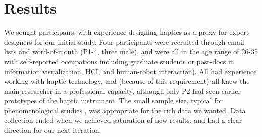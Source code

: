 %
% 
\section{Results}

We sought participants with experience designing haptics as a proxy for expert designers for our initial study.
Four participants were recruited through email lists and word-of-mouth (P1-4, three male), and were all in the age range of 26-35 with self-reported occupations including graduate students or post-docs in information visualization, HCI, and human-robot interaction).
All had experience working with haptic technology, and (because of this requirement) all knew the main researcher in a professional capacity, although only P2 had seen earlier prototypes of the haptic instrument.
The small sample size, typical for phenomenological studies \cite{Creswell2013}, was appropriate for the rich data we wanted.
Data collection ended when we achieved saturation of new results, and had a clear direction for our next iteration.



%
%




